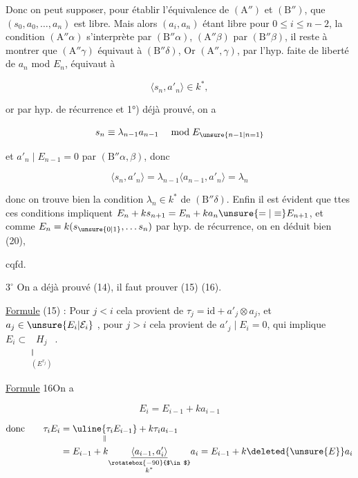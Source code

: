 Donc on peut supposer, pour établir l'équivalence de $(\mathrm A'')$ et $(\mathrm B'')$, que $(s_0,a_0,\ldots,a_n)$ est libre. Mais alors  $(a_i,a_n)$ étant libre pour $0\leq i\leq n-2$, la condition  $(\mathrm A''\alpha)$ s'interprète par $(\mathrm B''\alpha)$, $(\mathrm A''\beta)$ par $(\mathrm B''\beta)$, il reste à montrer que $(\mathrm A''\gamma)$ équivaut à $(\mathrm B''\delta)$,  Or $(\mathrm A'',\gamma)$, par l'hyp. faite de liberté de $a_n$ mod $E_n$, équivaut à

\[\langle s_n,a'_n\rangle\in k^*,\]

or par hyp. de récurrence et 1°) déjà prouvé, on a

\[s_n\equiv\lambda_{n-1}a_{n-1}\quad\bmod E_{\unsure{n-1|n=1}}\]

et $a'_n\mid E_{n-1}=0$ par $(\mathrm B''\alpha,\beta)$, donc

\[\langle s_n,a'_n\rangle=\lambda_{n-1}\langle a_{n-1},a'_n\rangle=\lambda_n\]

donc on trouve bien la condition $\lambda_n\in k^*$ de $(\mathrm B''\delta)$. Enfin il est évident que ttes ces conditions impliquent $E_n+ks_{n+1}=E_n+ka_n\unsure{=|\equiv}E_{n+1}$, et comme $E_n=k(s_{\unsure{0|1}},\ldots s_n)$ par hyp. de récurrence, on en déduit bien (20),

cqfd.


\textcircled{\scriptsize $3^\circ$} On a déjà prouvé (14), il faut prouver (15) (16).

\uline{Formule} (15) : Pour $j<i$ cela provient de $\tau_j=\mathrm{id}+a'_j\otimes a_j$, et $a_j\in\unsure{E_i|\mathcal E_i}$ , pour $j>i$ cela provient de $a'_j\mid E_i=0$, qui implique $E_i\subset\underset{\substack{\Vert\\(E^{\tau_j})}}{H_j}$.

\uline{Formule} 16\qquad On a

\[E_i=E_{i-1}+ka_{i-1}\]

\[\begin{aligned}\text{donc}\qquad\tau_i E_i&=\underset{\Vert}{\uline{\tau_i E_{i-1}}}+k\tau_i a_{i-1}\\ &=E_{i-1}+k\underset{\substack{\rotatebox{-90}{$\in$}\\ k^*}}{\underline{\langle a_{i-1},a'_i\rangle}}a_i=E_{i-1}+k\deleted{\unsure{E}}a_i\end{aligned}\]

